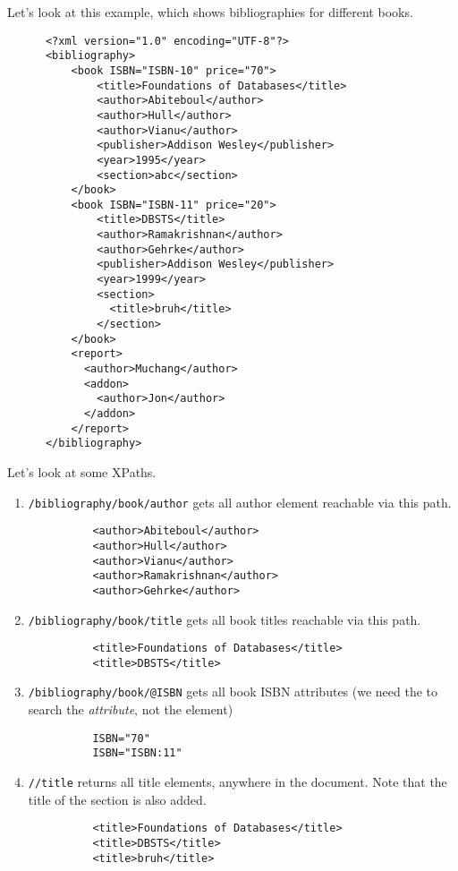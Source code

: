   \begin{example}
    Let's look at this example, which shows bibliographies for different books. 
    \begin{lstlisting}
      <?xml version="1.0" encoding="UTF-8"?>
      <bibliography>
          <book ISBN="ISBN-10" price="70">
              <title>Foundations of Databases</title>
              <author>Abiteboul</author>
              <author>Hull</author>
              <author>Vianu</author>
              <publisher>Addison Wesley</publisher>
              <year>1995</year>
              <section>abc</section>
          </book>
          <book ISBN="ISBN-11" price="20">
              <title>DBSTS</title>
              <author>Ramakrishnan</author>
              <author>Gehrke</author>
              <publisher>Addison Wesley</publisher>
              <year>1999</year>
              <section>
                <title>bruh</title>
              </section>
          </book>
          <report>
            <author>Muchang</author>
            <addon>
              <author>Jon</author>
            </addon>
          </report>
      </bibliography> 
    \end{lstlisting}
    Let's look at some XPaths. 
    \begin{enumerate}
      \item \texttt{/bibliography/book/author} gets all author element reachable via this path.
        \begin{lstlisting}
          <author>Abiteboul</author>
          <author>Hull</author>
          <author>Vianu</author>
          <author>Ramakrishnan</author>
          <author>Gehrke</author>
        \end{lstlisting}

      \item \texttt{/bibliography/book/title} gets all book titles reachable via this path. 
        \begin{lstlisting}
          <title>Foundations of Databases</title>
          <title>DBSTS</title>
        \end{lstlisting}

      \item \texttt{/bibliography/book/@ISBN} gets all book ISBN attributes (we need the \texttt{\@} to search the \textit{attribute}, not the element)
        \begin{lstlisting}
          ISBN="70"
          ISBN="ISBN:11"
        \end{lstlisting}

      \item \texttt{//title} returns all title elements, anywhere in the document. Note that the title of the section is also added. 
        \begin{lstlisting}
          <title>Foundations of Databases</title>
          <title>DBSTS</title>
          <title>bruh</title>
        \end{lstlisting}


\end{enumerate}
\end{example}
